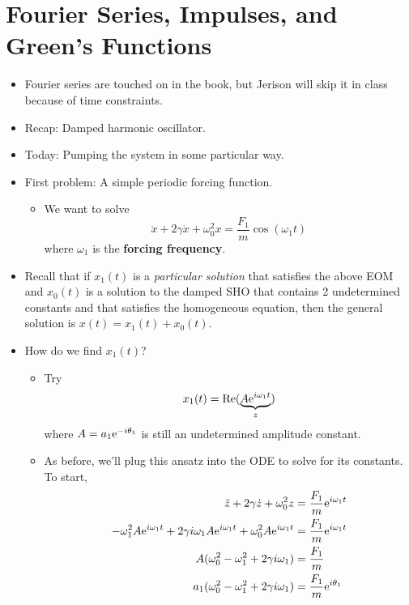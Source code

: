 \documentclass[../notes.tex]{subfiles}
\begin{document}
\section{Fourier Series, Impulses, and Green's Functions}
\begin{itemize}
    \item {}Fourier series are touched on in the book, but Jerison will skip it in class because of time constraints.
    \item Recap: Damped harmonic oscillator.
    \item Today: Pumping the system in some particular way.
    \item First problem: A simple periodic forcing function.
    \begin{itemize}
        \item We want to solve
        \begin{equation*}
            \ddot{x}+2\gamma\dot{x}+\omega_0^2x = \frac{F_1}{m}\cos(\omega_1t)
        \end{equation*}
        where $\omega_1$ is the \textbf{forcing frequency}.
    \end{itemize}
    \item Recall that if $x_1(t)$ is a \emph{particular solution} that satisfies the above EOM and $x_0(t)$ is a solution to the damped SHO that contains 2 undetermined constants and that satisfies the homogeneous equation, then the general solution is $x(t)=x_1(t)+x_0(t)$.
    \item How do we find $x_1(t)$?
    \begin{itemize}
        \item Try
        \begin{equation*}
            x_1(t) = \re(\underbrace{A\e[i\omega_1t]}_z)
        \end{equation*}
        where $A=a_1\e[-i\theta_1]$ is still an undetermined amplitude constant.
        \item As before, we'll plug this ansatz into the ODE to solve for its constants. To start,
        \begin{align*}
            \ddot{z}+2\gamma\dot{z}+\omega_0^2z &= \frac{F_1}{m}\e[i\omega_1t]\\
            -\omega_1^2A\e[i\omega_1t]+2\gamma i\omega_1A\e[i\omega_1t]+\omega_0^2A\e[i\omega_1t] &= \frac{F_1}{m}\e[i\omega_1t]\\
            A(\omega_0^2-\omega_1^2+2\gamma i\omega_1) &= \frac{F_1}{m}\\
            a_1(\omega_0^2-\omega_1^2+2\gamma i\omega_1) &= \frac{F_1}{m}\e[i\theta_1]\\

\end{align*}
\end{itemize}
\end{itemize}
\end{document}
